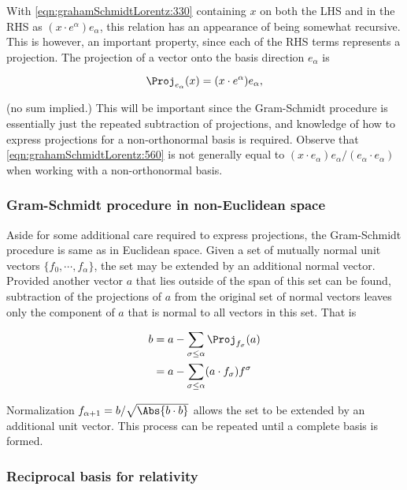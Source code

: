With \ref{eqn:grahamSchmidtLorentz:330} containing $x$ on both the LHS and in the RHS as $(x \cdot e^\alpha) e_\alpha$, this relation has an appearance of being somewhat recursive.  This is however, an important property, since each of the RHS terms represents a projection.  The projection of a vector onto the basis direction $e_\alpha$ is

\begin{equation}\label{eqn:grahamSchmidtLorentz:560}
\Proj_{e_\alpha}(x) = (x \cdot e^\alpha) e_\alpha,
\end{equation}

(no sum implied.)  
This will be important since the Gram-Schmidt procedure is essentially just the repeated subtraction of projections, and knowledge of how to express projections for a non-orthonormal basis is required.
Observe that \ref{eqn:grahamSchmidtLorentz:560} is not generally equal to $(x \cdot e_\alpha) e_\alpha/ (e_\alpha \cdot e_\alpha)$ when working with a non-orthonormal basis.

\subsubsection{Gram-Schmidt procedure in non-Euclidean space}

Aside for some additional care required to express projections, the Gram-Schmidt procedure is same as in Euclidean space.
Given a set of mutually normal unit vectors $\{f_0, \cdots, f_\alpha\}$, the set may be extended by an additional normal vector.  Provided another vector $a$ that lies outside of the span of this set can be found, subtraction of the projections of $a$ from the original set of normal vectors leaves only the component of $a$ that is normal to all vectors in this set.  That is

\begin{equation}\label{eqn:grahamSchmidtLorentz:660}
\begin{aligned}
b
&= a - \sum_{\sigma \le \alpha} \Proj_{f_\sigma}(a) \\
&= a - \sum_{\sigma \le \alpha} (a \cdot f_\sigma) f^\sigma
\end{aligned}
\end{equation}

Normalization $f_{\alpha+1} = b/\sqrt{\Abs{b \cdot b}}$ allows the set to be extended by an additional unit vector.  This process can be repeated until a complete basis is formed.

\subsubsection{Reciprocal basis for relativity}

